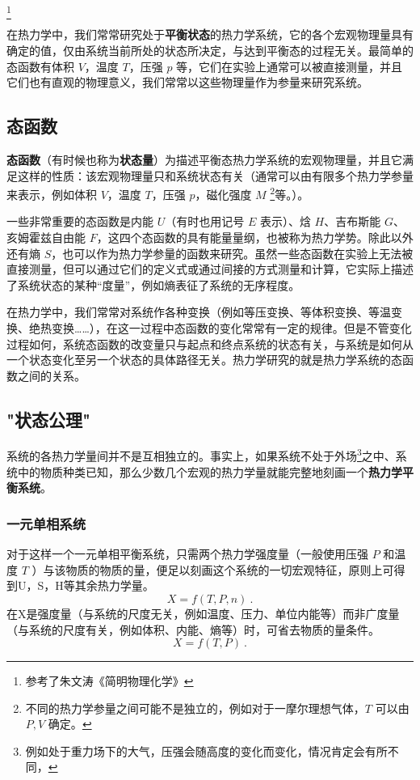 \footnote{参考了朱文涛《简明物理化学》}


在热力学中，我们常常研究处于\textbf{平衡状态}的热力学系统，它的各个宏观物理量具有确定的值，仅由系统当前所处的状态所决定，与达到平衡态的过程无关。最简单的态函数有体积 $V$，温度 $T$，压强 $p$ 等，它们在实验上通常可以被直接测量，并且它们也有直观的物理意义，我们常常以这些物理量作为参量来研究系统。
\subsection{态函数}
\textbf{态函数}（有时候也称为\textbf{状态量}）为描述平衡态热力学系统的宏观物理量，并且它满足这样的性质：该宏观物理量只和系统状态有关（通常可以由有限多个热力学参量来表示，例如体积 $V$，温度 $T$，压强 $p$，磁化强度 $M$ \footnote{不同的热力学参量之间可能不是独立的，例如对于一摩尔理想气体，$T$ 可以由 $P,V$ 确定。}等。）。

一些非常重要的态函数是内能 $U$（有时也用记号 $E$ 表示）、焓 $H$、吉布斯能 $G$、亥姆霍兹自由能 $F$，这四个态函数的具有能量量纲，也被称为热力学势。除此以外还有熵 $S$，也可以作为热力学参量的函数来研究。虽然一些态函数在实验上无法被直接测量，但可以通过它们的定义式或通过间接的方式测量和计算，它实际上描述了系统状态的某种“度量”，例如熵表征了系统的无序程度。

在热力学中，我们常常对系统作各种变换（例如等压变换、等体积变换、等温变换、绝热变换……），在这一过程中态函数的变化常常有一定的规律。但是不管变化过程如何，系统态函数的改变量只与起点和终点系统的状态有关，与系统是如何从一个状态变化至另一个状态的具体路径无关。热力学研究的就是热力学系统的态函数之间的关系。

\subsection{"状态公理"}
系统的各热力学量间并不是互相独立的。事实上，如果系统不处于外场\footnote{例如处于重力场下的大气，压强会随高度的变化而变化，情况肯定会有所不同，}之中、系统中的物质种类已知，那么少数几个宏观的热力学量就能完整地刻画一个\textbf{热力学平衡系统}。

\subsubsection{一元单相系统}
对于这样一个一元单相平衡系统，只需两个热力学强度量（一般使用压强 $P$ 和温度 $T$ ）与该物质的物质的量，便足以刻画这个系统的一切宏观特征，原则上可得到U，S，H等其余热力学量。
\begin{equation}
X=f(T,P,n)~.
\end{equation}
在X是强度量（与系统的尺度无关，例如温度、压力、单位内能等）而非广度量（与系统的尺度有关，例如体积、内能、熵等）时，可省去物质的量条件。
\begin{equation}
X=f(T,P)~.
\end{equation}

